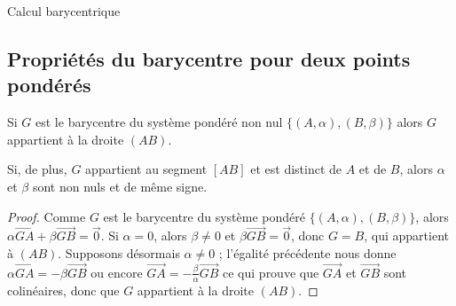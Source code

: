 \begin{chapter}{Calcul barycentrique}
\begin{exe}
\begin{minipage}{.4\actualtextwidth}
\end{minipage}
\end{exe}
%
\subsection{Propri\'et\'es du barycentre pour deux points pond\'er\'es}
\begin{prop}
	Si $G$ est le barycentre du syst\`eme pond\'er\'e non nul $\{ (A,\alpha) , (B,\beta) \}$ 
	alors $G$ appartient \`a la droite $(AB)$.
	
	Si, de plus, $G$ appartient au segment $[AB]$ et est distinct de $A$ et de $B$, alors $\alpha$ et $\beta$ sont non nuls et de m\^eme signe.
%
	\begin{proof}
		Comme $G$ est le barycentre du syst\`eme pond\'er\'e $\{ (A,\alpha) , (B,\beta) \}$, 
		alors $\alpha \overrightarrow{GA} + \beta \overrightarrow{GB} = \vec{0}$.
		Si $\alpha = 0$, alors $\beta \neq 0$ et $\beta \overrightarrow{GB} = \vec{0}$, donc $G = B$, qui appartient \`a $(AB)$.
		Supposons d\'esormais $\alpha \neq 0$ ; l'\'egalit\'e pr\'ec\'edente nous donne $\alpha \overrightarrow{GA} = -\beta \overrightarrow{GB}$
		ou encore $\overrightarrow{GA} = - \frac{\beta}{\alpha} \overrightarrow{GB}$
		ce qui prouve que $\overrightarrow{GA}$ et $\overrightarrow{GB}$ sont colin\'eaires, donc que $G$ appartient \`a la droite $(AB)$.
		

\end{proof}
\end{prop}
\end{chapter}
